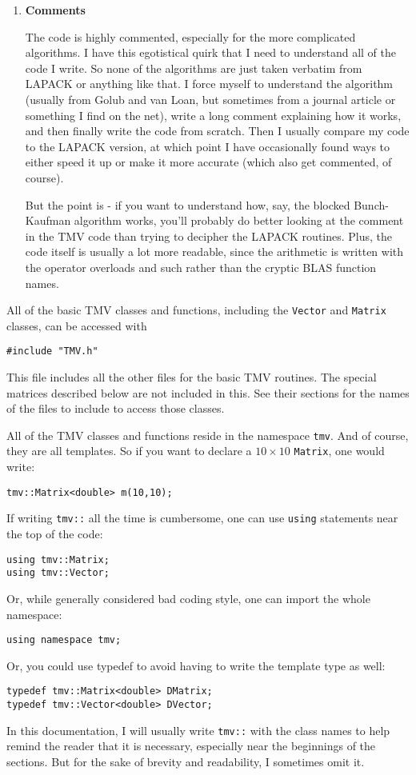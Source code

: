 \documentclass[twoside,letterpaper,11pt]{article}
\renewcommand{\tt}[1]{{\texttt {#1}}}
\begin{document}
\begin{enumerate}
\item
\textbf{Comments}

The code is highly commented, especially for the more complicated algorithms.
I have this egotistical quirk that I need to understand all of the code I write.
So none of the algorithms are just taken verbatim from LAPACK or anything like that.
I force myself to understand the algorithm (usually from Golub and van Loan,
but sometimes from a journal article or something I find on the net),
write a long comment explaining how it works, and then finally write the code
from scratch.  Then I usually compare my code to the LAPACK version, at which point
I have occasionally found ways to either speed it up or make it more accurate
(which also get commented, of course).

But the point is - if you want to understand how, say, the blocked Bunch-Kaufman
algorithm works, you'll probably do better looking at the comment in the 
TMV code than trying to decipher the LAPACK routines.  Plus, the code itself is
usually a lot more readable, since the arithmetic is written with the operator
overloads and such rather than the cryptic BLAS function names.

\end{enumerate}
All of the basic TMV classes and functions, including the \tt{Vector} and \tt{Matrix} 
classes, can be accessed with
\begin{verbatim}
#include "TMV.h"
\end{verbatim}
This file includes all the other files for the basic TMV routines.  The 
special matrices described below are not included in this.  
See their sections for the names
of the files to include to access those classes.

All of the TMV classes and functions reside in the namespace \tt{tmv}. 
And of course, they are all templates.
So if you want to declare a $10 \times 10$ \tt{Matrix}, one would write:
\begin{verbatim}
tmv::Matrix<double> m(10,10);
\end{verbatim}

If writing \tt{tmv::} all the time is cumbersome, one can use \tt{using}
statements near the top of the code:
\begin{verbatim}
using tmv::Matrix;
using tmv::Vector;
\end{verbatim}
Or, while generally considered bad coding style, one can import the whole namespace:
\begin{verbatim}
using namespace tmv;
\end{verbatim}
Or, you could use typedef to avoid having to write the template type as well:
\begin{verbatim}
typedef tmv::Matrix<double> DMatrix;
typedef tmv::Vector<double> DVector;
\end{verbatim}
In this documentation, I will usually write \tt{tmv::} with the class names to help remind the reader
that it is necessary, especially near the 
beginnings of the sections.  
But for the sake of brevity and readability, I sometimes omit it.
\end{document}
